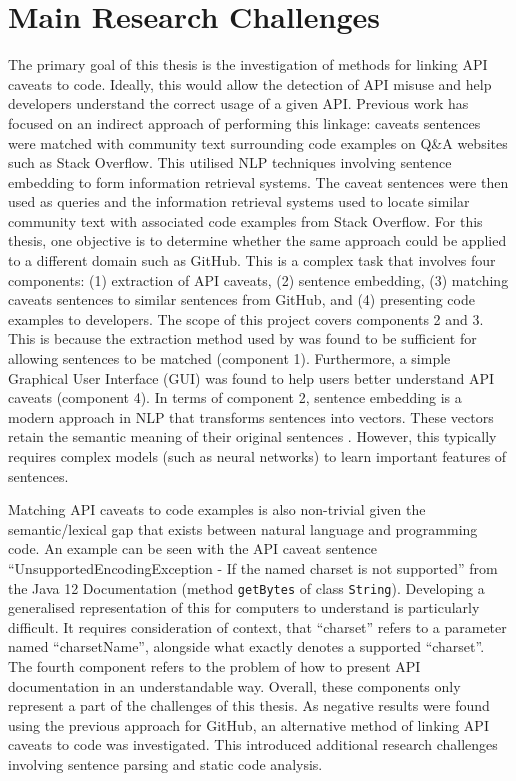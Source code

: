 \section{Main Research Challenges}
\label{sec:mainresearchchallenges}
The primary goal of this thesis is the investigation of methods for linking API caveats to code. Ideally, this would allow the detection of API misuse and help developers understand the correct usage of a given API. Previous work has focused on an indirect approach of performing this linkage: caveats sentences were matched with community text surrounding code examples on Q\&A websites such as Stack Overflow. This utilised NLP techniques involving sentence embedding to form information retrieval systems. The caveat sentences were then used as queries and the information retrieval systems used to locate similar community text with associated code examples from Stack Overflow. For this thesis, one objective is to determine whether the same approach could be applied to a different domain such as GitHub. This is a complex task that involves four components: (1) extraction of API caveats, (2) sentence embedding, (3) matching caveats sentences to similar sentences from GitHub, and (4) presenting code examples to developers. The scope of this project covers components 2 and 3. This is because the extraction method used by \cite{jiamou} was found to be sufficient for allowing sentences to be matched (component 1). Furthermore, a simple Graphical User Interface (GUI) was found to help users better understand API caveats (component 4). In terms of component 2, sentence embedding is a modern approach in NLP that transforms sentences into vectors. These vectors retain the semantic meaning of their original sentences \cite{palangi2016deep}. However, this typically requires complex models (such as neural networks) to learn important features of sentences. \bigbreak

Matching API caveats to code examples is also non-trivial given the semantic/lexical gap that exists between natural language and programming code. An example can be seen with the API caveat sentence ``UnsupportedEncodingException - If the named charset is not supported'' from the Java 12 Documentation (method \lstinline{getBytes} of class \lstinline{String}). Developing a generalised representation of this for computers to understand is particularly difficult. It requires consideration of context, that ``charset'' refers to a parameter named ``charsetName'', alongside what exactly denotes a supported ``charset''. The fourth component refers to the problem of how to present API documentation in an understandable way. Overall, these components only represent a part of the challenges of this thesis. As negative results were found using the previous approach for GitHub, an alternative method of linking API caveats to code was investigated. This introduced additional research challenges involving sentence parsing and static code analysis.\bigbreak

